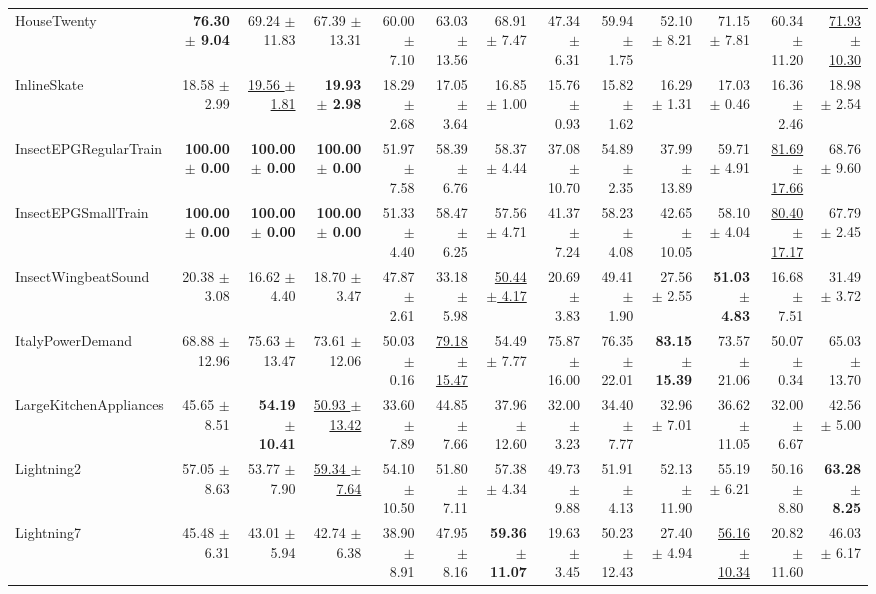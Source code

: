 \begin{landscape}
\begin{longtable}{lrrrrrrrrrrrr}
HouseTwenty & \textbf{76.30 $\pm$ 9.04} & 69.24 $\pm$ 11.83 & 67.39 $\pm$ 13.31 & 60.00 $\pm$ 7.10 & 63.03 $\pm$ 13.56 & 68.91 $\pm$ 7.47 & 47.34 $\pm$ 6.31 & 59.94 $\pm$ 1.75 & 52.10 $\pm$ 8.21 & 71.15 $\pm$ 7.81 & 60.34 $\pm$ 11.20 & \underline{71.93 $\pm$ 10.30} \\
InlineSkate & 18.58 $\pm$ 2.99 & \underline{19.56 $\pm$ 1.81} & \textbf{19.93 $\pm$ 2.98} & 18.29 $\pm$ 2.68 & 17.05 $\pm$ 3.64 & 16.85 $\pm$ 1.00 & 15.76 $\pm$ 0.93 & 15.82 $\pm$ 1.62 & 16.29 $\pm$ 1.31 & 17.03 $\pm$ 0.46 & 16.36 $\pm$ 2.46 & 18.98 $\pm$ 2.54 \\
InsectEPGRegularTrain & \textbf{100.00 $\pm$ 0.00} & \textbf{100.00 $\pm$ 0.00} & \textbf{100.00 $\pm$ 0.00} & 51.97 $\pm$ 7.58 & 58.39 $\pm$ 6.76 & 58.37 $\pm$ 4.44 & 37.08 $\pm$ 10.70 & 54.89 $\pm$ 2.35 & 37.99 $\pm$ 13.89 & 59.71 $\pm$ 4.91 & \underline{81.69 $\pm$ 17.66} & 68.76 $\pm$ 9.60 \\
InsectEPGSmallTrain & \textbf{100.00 $\pm$ 0.00} & \textbf{100.00 $\pm$ 0.00} & \textbf{100.00 $\pm$ 0.00} & 51.33 $\pm$ 4.40 & 58.47 $\pm$ 6.25 & 57.56 $\pm$ 4.71 & 41.37 $\pm$ 7.24 & 58.23 $\pm$ 4.08 & 42.65 $\pm$ 10.05 & 58.10 $\pm$ 4.04 & \underline{80.40 $\pm$ 17.17} & 67.79 $\pm$ 2.45 \\
InsectWingbeatSound & 20.38 $\pm$ 3.08 & 16.62 $\pm$ 4.40 & 18.70 $\pm$ 3.47 & 47.87 $\pm$ 2.61 & 33.18 $\pm$ 5.98 & \underline{50.44 $\pm$ 4.17} & 20.69 $\pm$ 3.83 & 49.41 $\pm$ 1.90 & 27.56 $\pm$ 2.55 & \textbf{51.03 $\pm$ 4.83} & 16.68 $\pm$ 7.51 & 31.49 $\pm$ 3.72 \\
ItalyPowerDemand & 68.88 $\pm$ 12.96 & 75.63 $\pm$ 13.47 & 73.61 $\pm$ 12.06 & 50.03 $\pm$ 0.16 & \underline{79.18 $\pm$ 15.47} & 54.49 $\pm$ 7.77 & 75.87 $\pm$ 16.00 & 76.35 $\pm$ 22.01 & \textbf{83.15 $\pm$ 15.39} & 73.57 $\pm$ 21.06 & 50.07 $\pm$ 0.34 & 65.03 $\pm$ 13.70 \\
LargeKitchenAppliances & 45.65 $\pm$ 8.51 & \textbf{54.19 $\pm$ 10.41} & \underline{50.93 $\pm$ 13.42} & 33.60 $\pm$ 7.89 & 44.85 $\pm$ 7.66 & 37.96 $\pm$ 12.60 & 32.00 $\pm$ 3.23 & 34.40 $\pm$ 7.77 & 32.96 $\pm$ 7.01 & 36.62 $\pm$ 11.05 & 32.00 $\pm$ 6.67 & 42.56 $\pm$ 5.00 \\
Lightning2 & 57.05 $\pm$ 8.63 & 53.77 $\pm$ 7.90 & \underline{59.34 $\pm$ 7.64} & 54.10 $\pm$ 10.50 & 51.80 $\pm$ 7.11 & 57.38 $\pm$ 4.34 & 49.73 $\pm$ 9.88 & 51.91 $\pm$ 4.13 & 52.13 $\pm$ 11.90 & 55.19 $\pm$ 6.21 & 50.16 $\pm$ 8.80 & \textbf{63.28 $\pm$ 8.25} \\
Lightning7 & 45.48 $\pm$ 6.31 & 43.01 $\pm$ 5.94 & 42.74 $\pm$ 6.38 & 38.90 $\pm$ 8.91 & 47.95 $\pm$ 8.16 & \textbf{59.36 $\pm$ 11.07} & 19.63 $\pm$ 3.45 & 50.23 $\pm$ 12.43 & 27.40 $\pm$ 4.94 & \underline{56.16 $\pm$ 10.34} & 20.82 $\pm$ 11.60 & 46.03 $\pm$ 6.17 \\

\end{longtable}
\end{landscape}
